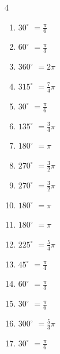 \begin{multicols}{4}
\begin{enumerate}
  \item $\displaystyle 30^{\circ}$
        $\displaystyle =\frac{\pi}{6}$

  \item $\displaystyle 60^{\circ}$
        $\displaystyle =\frac{\pi}{3}$

  \item $\displaystyle 360^{\circ}$
        $\displaystyle =2\pi$

  \item $\displaystyle 315^{\circ}$
        $\displaystyle =\frac{7}{4}\pi$

  \item $\displaystyle 30^{\circ}$
        $\displaystyle =\frac{\pi}{6}$

\columnbreak %

\resetques

  \item $\displaystyle 135^{\circ}$
        $\displaystyle =\frac{3}{4}\pi$

  \item $\displaystyle 180^{\circ}$
        $\displaystyle =\pi$

  \item $\displaystyle 270^{\circ}$
        $\displaystyle =\frac{3}{2}\pi$

  \item $\displaystyle 270^{\circ}$
        $\displaystyle =\frac{3}{2}\pi$

  \item $\displaystyle 180^{\circ}$
        $\displaystyle =\pi$

  \item $\displaystyle 180^{\circ}$
        $\displaystyle =\pi$

  \item $\displaystyle 225^{\circ}$
        $\displaystyle =\frac{5}{4}\pi$

  \item $\displaystyle 45^{\circ}$
        $\displaystyle =\frac{\pi}{4}$

  \item $\displaystyle 60^{\circ}$
        $\displaystyle =\frac{\pi}{3}$

  \item $\displaystyle 30^{\circ}$
        $\displaystyle =\frac{\pi}{6}$

  \item $\displaystyle 300^{\circ}$
        $\displaystyle =\frac{5}{3}\pi$

  \item $\displaystyle 30^{\circ}$
        $\displaystyle =\frac{\pi}{6}$


\end{enumerate}
\end{multicols}
